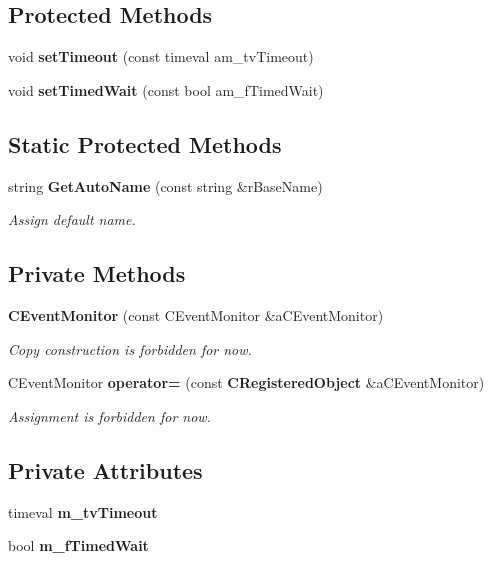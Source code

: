 \subsection*{Protected Methods}
\begin{CompactItemize}
\item 
void {\bf set\-Timeout} (const timeval am\_\-tv\-Timeout)
\item 
void {\bf set\-Timed\-Wait} (const bool am\_\-f\-Timed\-Wait)
\end{CompactItemize}
\subsection*{Static Protected Methods}
\begin{CompactItemize}
\item 
string {\bf Get\-Auto\-Name} (const string \&r\-Base\-Name)
\begin{CompactList}\small\item\em Assign default name.\item\end{CompactList}\end{CompactItemize}
\subsection*{Private Methods}
\begin{CompactItemize}
\item 
{\bf CEvent\-Monitor} (const CEvent\-Monitor \&a\-CEvent\-Monitor)
\begin{CompactList}\small\item\em Copy construction is forbidden for now.\item\end{CompactList}\item 
CEvent\-Monitor {\bf operator=} (const {\bf CRegistered\-Object} \&a\-CEvent\-Monitor)
\begin{CompactList}\small\item\em Assignment is forbidden for now.\item\end{CompactList}\end{CompactItemize}
\subsection*{Private Attributes}
\begin{CompactItemize}
\item 
timeval {\bf m\_\-tv\-Timeout}
\item 
bool {\bf m\_\-f\-Timed\-Wait}
\end{CompactItemize}
